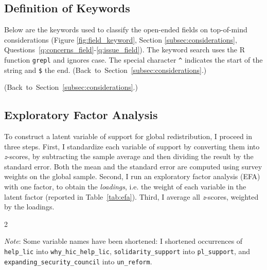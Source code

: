 \subsection{Definition of Keywords}\label{subsec:keywords}

Below are the keywords used to classify the open-ended fields on top-of-mind considerations (Figure \ref{fig:field_keyword}, Section \ref{subsec:considerations}, Questions~\ref{q:concerns_field}-\ref{q:issue_field}). The keyword search uses the R function \verb|grepl| and ignores case. The special character \verb|^| indicates the start of the string and \verb|$| the end. \hfill (Back~to~Section~\ref{subsec:considerations}.)

 \hfill (Back~to~Section~\ref{subsec:considerations}.)


% 

% 


\subsection{Exploratory Factor Analysis}\label{subsec:efa}

To construct a latent variable of support for global redistribution, I proceed in three steps. First, I standardize each variable of support by converting them into \textit{z}-scores, by subtracting the sample average and then dividing the result by the standard error. Both the mean and the standard error are computed using survey weights on the global sample. 
Second, I run an exploratory factor analysis (EFA) with one factor, to obtain the \textit{loadings}, i.e. the weight of each variable in the latent factor (reported in Table~\ref{tab:efa}). 
Third, I average all \textit{z}-scores, weighted by the loadings. 

\begin{paracol}{2}
\captionsetup{type=table} %
\label{tab:efa}
               
\end{paracol}
 {\footnotesize \textit{Note}: Some variable names have been shortened: I shortened occurrences of \verb|help_lic| into \verb|why_hic_help_lic|, \verb|solidarity_support| into \verb|pl_support|, and \verb|expanding_security_council| into \verb|un_reform|. }


